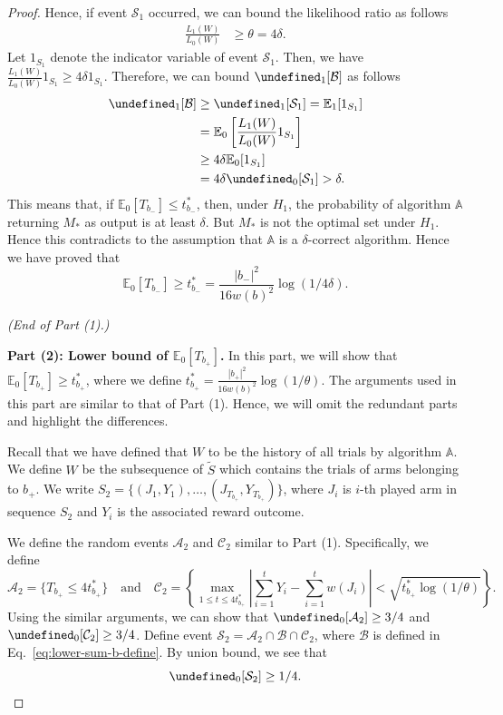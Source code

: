 \documentclass{article}
\newcommand{\E}{\mathbb E}
\let\Pr\undefined
\DeclareMathOperator{\Pr}{Pr}
\begin{document}
\begin{proof}
Hence, if event $\mathcal S_1$ occurred, we can bound the likelihood ratio as follows
\begin{align}
\frac{L_1(W)}{L_0(W)} &\ge \theta = 4\delta.
\end{align}
Let $1_{S_1}$ denote the indicator variable of event $\mathcal S_1$.
Then, we have $
\frac{L_1(W)}{L_0(W)} 1_{S_1} \ge 4\delta 1_{S_1}$.
Therefore, we can bound $\Pr_1[\mathcal B]$ as follows
\begin{align}
\Pr_1[\mathcal B] &\ge \Pr_1[\mathcal S_1] = \E_1[1_{S_1}] \nonumber \\
				  &= \E_0\left[\frac{L_1(W)}{L_0(W)} 1_{S_1}\right] \nonumber \\
				  &\ge 4\delta \E_0[1_{S_1}] \nonumber \\
				  &= 4\delta \Pr_0[\mathcal S_1] > \delta \label{eq:lower-sum-case-1-final}.
\end{align}
This means that, if $\E_0[T_{b_-}] \le t_{b_-}^*$, then, under $H_1$, the probability of algorithm $\mathbb A$ returning $M_*$ as output is at least $\delta$. 
But $M_*$ is not the optimal set under $H_1$. Hence this contradicts to the assumption that $\mathbb A$ is a $\delta$-correct algorithm.
Hence we have proved that 
\begin{equation}
\label{eq:lower-sum-case-1-a}
\E_0[T_{b_-}] \ge t_{b_-}^* = \frac{|b_-|^2}{16 w(b)^2}\log(1/4\delta).
\end{equation}

\emph{(End of Part (1).)}

\textbf{Part (2): Lower bound of $\E_0[T_{b_+}]$.} In this part, we will show that $\E_0[T_{b_+}]\ge t_{b_+}^*$, where we define $t_{b_+}^* = \frac{|b_+|^2}{16 w(b)^2}\log(1/\theta)$.
The arguments used in this part are similar to that of Part (1). 
Hence, we will omit the redundant parts and highlight the differences.

Recall that we have defined that $W$ to be the history of all trials by algorithm $\mathbb A$.
We define $W$ be the subsequence of $\tilde S$ which contains the trials of arms belonging to $b_+$.
We write $S_2=\{(J_1,Y_1),\ldots,(J_{T_{b_+}}, Y_{T_{b_+}})\}$, where $J_i$ is $i$-th played arm in sequence $S_2$ and $Y_i$ is the associated reward outcome.

We define the random events $\mathcal A_2$ and $\mathcal C_2$ similar to Part (1).
Specifically, we define 
$$
\mathcal A_2 = \{T_{b_+} \le 4t_{b_+}^* \} \quad\text{and}\quad
\mathcal C_2 = \left\{\max_{1\le t \le 4t_{b_+}^*} \left|\sum_{i=1}^t Y_i - \sum_{i=1}^t w(J_i)\right|  < \sqrt{t_{b_+}^*\log(1/\theta)} \right\}.
$$
Using the similar arguments, we can show that 
$\Pr_0[\mathcal A_2] \ge 3/4$ and $\Pr_0[\mathcal C_2] \ge 3/4$.
Define event $\mathcal S_2 = \mathcal A_2 \cap \mathcal B \cap \mathcal C_2$, where $\mathcal B$ is defined in Eq.~\eqref{eq:lower-sum-b-define}.
By union bound, we see that 
$$
\Pr_0[\mathcal S_2] \ge 1/4.
$$


\end{proof}
\end{document}
